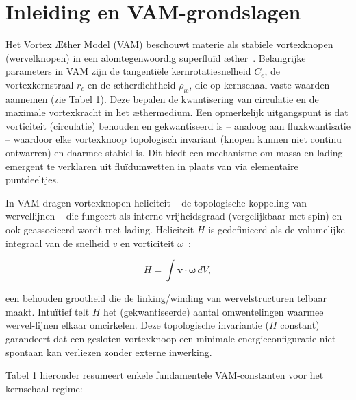 
\section{Inleiding en VAM-grondslagen}

Het Vortex Æther Model (VAM) beschouwt materie als stabiele vortexknopen (wervelknopen) in een alomtegenwoordig superfluïd æther~\cite{Kelvin1867VortexAtoms}. Belangrijke parameters in VAM zijn de tangentiële kernrotatiesnelheid $C_e$, de vortexkernstraal $r_c$ en de
ætherdichtheid $\rho_\text{\ae}$, die op kernschaal vaste waarden aannemen (zie Tabel 1). Deze bepalen de kwantisering van circulatie en de maximale vortexkracht in het æthermedium. Een opmerkelijk uitgangspunt is dat vorticiteit (circulatie) behouden en gekwantiseerd is – analoog aan fluxkwantisatie – waardoor elke vortexknoop topologisch invariant (knopen kunnen niet continu ontwarren) en daarmee stabiel is. Dit biedt een mechanisme om massa en lading emergent te verklaren uit fluïdumwetten in plaats van via elementaire puntdeeltjes.

In VAM dragen vortexknopen heliciteit – de topologische koppeling van wervellijnen – die fungeert als interne vrijheidsgraad (vergelijkbaar met
spin) en ook geassocieerd wordt met lading. Heliciteit $H$ is gedefinieerd als de volumelijke integraal van de snelheid $v$ en vorticiteit $\omega$~\cite{Moffatt1990VortexHelicity, Ricca1992EnergyHelicity}:


\begin{equation}
    H = \int \mathbf{v} \cdot \boldsymbol{\omega}\,dV,
\end{equation}

een behouden grootheid die de linking/winding van wervelstructuren telbaar maakt. Intuïtief telt $H$ het (gekwantiseerde) aantal omwentelingen waarmee wervel-lijnen elkaar omcirkelen. Deze topologische invariantie ($H$ constant) garandeert dat een gesloten vortexknoop een minimale energieconfiguratie niet spontaan kan verliezen zonder externe inwerking.

Tabel 1 hieronder resumeert enkele fundamentele VAM-constanten voor het kernschaal-regime:

